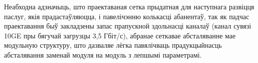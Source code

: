 Неабходна адзначыць, што праектаваная сетка прыдатная для
наступнага развіцця паслуг, якія прадастаўляюцца, і павелічэнню
колькасці абанентаў, так як падчас праектавання быў закладзены
запас прапускной здольнасці каналаў (канал сувязі 10GE пры бягучай
загрузцы 3,5 Гбіт/с), абранае сеткавае абсталяванне мае модульную
структуру, што дазваляе лёгка павялічваць прадукцыйнасць абсталявання
заменай модуля на модуль з лепшымі параметрамі.

